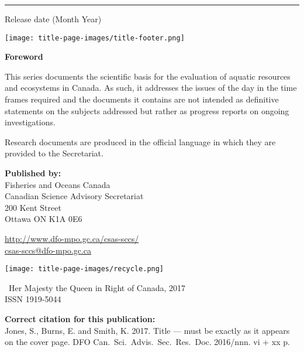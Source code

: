 \hrule

\vspace{-4.0mm}
\parbox{9cm}{Release date (Month Year)}%
\begin{minipage}[t]{7.48cm}
\flushright
\texttt{[image: title-page-images/title-footer.png]}%
\end{minipage}


\clearpage

\vspace*{\fill}

\begin{center}
\textbf{Foreword}
\end{center}
\vspace{-1.5mm}

This series documents the scientific basis for the evaluation of aquatic resources and
ecosystems in Canada. As such, it addresses the issues of the day in the time frames required
and the documents it contains are not intended as definitive statements on the subjects
addressed but rather as progress reports on ongoing investigations.

Research documents are produced in the official language in which they are provided to the Secretariat.

\vspace{1.5mm}

\begin{center}
\textbf{Published by:\\}
\vspace{0.2cm}
Fisheries and Oceans Canada\\
Canadian Science Advisory Secretariat\\
200 Kent Street\\
Ottawa ON K1A 0E6\\
\vspace{0.17cm}

\href{http://www.dfo-mpo.gc.ca/csas-sccs/}{http://www.dfo-mpo.gc.ca/csas-sccs/}\\
\href{mailto://csas-sccs@dfo-mpo.gc.ca}{csas-sccs@dfo-mpo.gc.ca}

\vspace{-3mm}
\texttt{[image: title-page-images/recycle.png]}

\vspace{-3mm}
\textcopyright\ Her Majesty the Queen in Right of Canada, 2017\\
ISSN 1919-5044
\end{center}

\vspace{-3mm}

\textbf{Correct citation for this publication:}\\
\vspace{0.2cm}
\hangindent=0.6cm Jones, S., Burns, E. and Smith, K. 2017. 
Title --- must be exactly as it appears on the cover page. 
DFO Can.\ Sci.\ Advis.\ Sec.\ Res.\ Doc. 2016/nnn. vi + xx p.
\vspace*{\fill}

\thispagestyle{nofooter}

